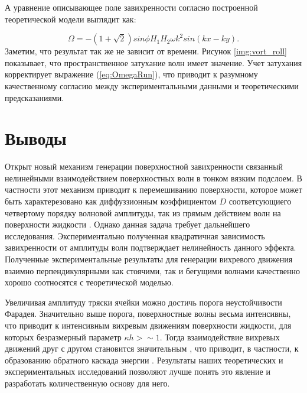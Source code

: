 А уравнение описывающее поле завихренности согласно построенной теоретической модели выглядит как:

\begin{equation}
 \label{eq:OmegaRun}
\Omega = -(1 + \sqrt{2})sin \phi H_1 H_2 \omega k^2 sin(kx-ky).
\end{equation}
Заметим, что результат так же не зависит от времени. Рисунок \ref{img:vort_roll} показывает, что пространственное затухание волн имеет значение. Учет затухания корректирует выражение (\ref{eq:OmegaRun}), что приводит к разумному качественному согласию между экспериментальными данными и теоретическими предсказаниями.%

\section{Выводы}
Открыт новый механизм генерации поверхностной завихренности связанный нелинейными взаимодействием поверхностных волн в тонком вязким подслоем. В частности этот механизм приводит к перемешиванию поверхности, которое может быть характерезовано как диффуззионным коэффициентом $D$ соответсующиего четвертому порядку волновой амплитуды, так из прямым действием волн на поверхности жидкости \cite{Falkovich2009, Buhler}. Однако данная задача требует дальнейшего исследования.
Экспериментально полученная квадратичная зависимость завихренности от амплитуды волн подтверждает нелинейность данного эффекта.
Полученные экспериментальные результаты для генерации вихревого движения взаимно перпендикулярными как стоячими, так и бегущими волнами качественно хорошо соотносятся с теоретической моделью.

Увеличивая амплитуду тряски ячейки можно достичь порога неустойчивости Фарадея. Значительно выше порога, поверхностные волны весьма интенсивны, что приводит к интенсивным вихревым движениям поверхности жидкости, для которых безразмерный параметр $\kappa h > \sim 1$. Тогда взаимодействие вихревых движений друг с другом становится значительным \cite{Punzmann}, что приводит, в частности, к образованию обратного каскада энергии \cite{Francois2013}. Результаты наших теоретических и экспериментальных исследований позволяют лучше понять это явление и разработать количественную основу для него.

\clearpage